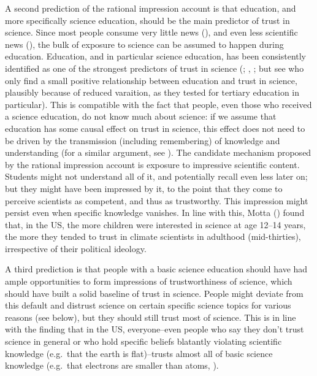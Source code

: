 \documentclass[
  man,
  floatsintext,
  longtable,
  nolmodern,
  notxfonts,
  notimes,
  colorlinks=true,linkcolor=blue,citecolor=blue,urlcolor=blue]{apa7}
\begin{document}
A second prediction of the rational impression account is that
education, and more specifically science education, should be the main
predictor of trust in science. Since most people consume very little
news (),
and even less scientific news
(), the
bulk of exposure to science can be assumed to happen during education.
Education, and in particular science education, has been consistently
identified as one of the strongest predictors of trust in science
(;
,
; but
see 
who only find a small positive relationship between education and trust
in science, plausibly because of reduced varaition, as they tested for
tertiary education in particular). This is compatible with the fact that
people, even those who received a science education, do not know much
about science: if we assume that education has some causal effect on
trust in science, this effect does not need to be driven by the
transmission (including remembering) of knowledge and understanding (for
a similar argument, see
). The
candidate mechanism proposed by the rational impression account is
exposure to impressive scientific content. Students might not understand
all of it, and potentially recall even less later on; but they might
have been impressed by it, to the point that they come to perceive
scientists as competent, and thus as trustworthy. This impression might
persist even when specific knowledge vanishes. In line with this, Motta
() found that, in
the US, the more children were interested in science at age 12--14
years, the more they tended to trust in climate scientists in adulthood
(mid-thirties), irrespective of their political ideology.

A third prediction is that people with a basic science education should
have had ample opportunities to form impressions of trustworthiness of
science, which should have built a solid baseline of trust in science.
People might deviate from this default and distrust science on certain
specific science topics for various reasons (see below), but they should
still trust most of science. This is in line with the finding that in
the US, everyone--even people who say they don't trust science in
general or who hold specific beliefs blatantly violating scientific
knowledge (e.g.~that the earth is flat)--trusts almost all of basic
science knowledge (e.g.~that electrons are smaller than atoms,
).
\end{document}
